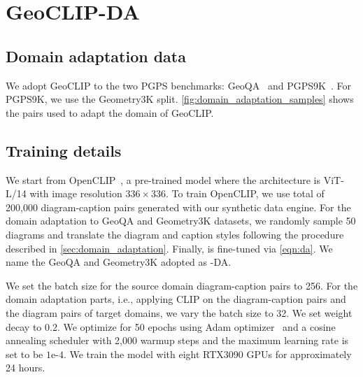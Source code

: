 \section{GeoCLIP-DA}

\subsection{Domain adaptation data}

We adopt GeoCLIP to the two PGPS benchmarks: GeoQA~\citep{geoqa} and PGPS9K~\citep{pgps}.
For PGPS9K, we use the Geometry3K split.
\cref{fig:domain_adaptation_samples} shows the pairs used to adapt the domain of GeoCLIP.



\subsection{Training details}

We start from OpenCLIP~\citep{clip}, a pre-trained model where the architecture is ViT-L/14 with image resolution $336\times 336$. To train OpenCLIP, we use total of 200,000 diagram-caption pairs generated with our synthetic data engine.
For the domain adaptation to GeoQA and Geometry3K datasets, we randomly sample 50 diagrams and translate the diagram and caption styles following the procedure described in \cref{sec:domain_adaptation}. Finally, \geoclip{} is fine-tuned via \cref{eqn:da}.
We name the GeoQA and Geometry3K adopted \geoclip{} as \geoclip{}-DA.

We set the batch size for the source domain diagram-caption pairs to 256. 
For the domain adaptation parts, i.e., applying CLIP on the diagram-caption pairs and the diagram pairs of target domains, we vary the batch size to 32.
We set weight decay to 0.2.
We optimize for 50 epochs using Adam optimizer~\citep{adam} and a cosine annealing scheduler with 2,000 warmup steps and the maximum learning rate is set to be $1\text{e-}4$.
We train the model with eight RTX3090 GPUs for approximately 24 hours.
